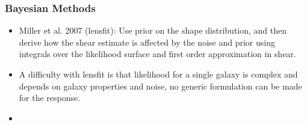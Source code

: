 \documentclass{beamer}
\begin{document}
\frame
{
    \frametitle{Bayesian Methods}

    \begin{itemize}

        \item Miller et al. 2007 (lensfit): Use prior on the shape distribution, and
            then derive how the shear estimate is affected by the noise and
            prior using integrals over the likelihood surface and first order
            approximation in shear.

        \item A difficulty with lensfit is that likelihood for a single galaxy is
            complex and depends on galaxy properties and noise, no generic formulation
            can be made for the response.

        \item
    \end{itemize}
}
\end{document}
